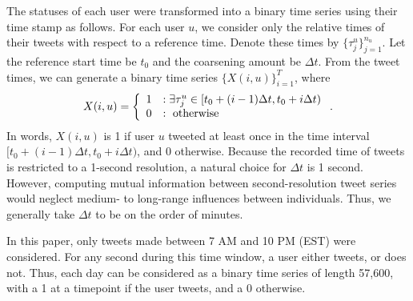 \documentclass[12pt]{article}
\begin{document}
The statuses of each user were transformed into a binary time series using their time stamp as follows. For each user $u$, we consider only the relative times of their tweets with respect to a reference time. Denote these times by $\{ \tau^{u}_{j}\}_{j = 1}^{n_{u}}$. Let the reference start time be $t_{0}$ and the coarsening amount be $\Delta t$. From the tweet times, we can generate a binary time series $\{ X(i, u)\}_{i = 1}^{T}$, where
\begin{align}
	X(i, u) = \left\{ \begin{array}{cl}
		1 &: \text{$ \exists \tau^{u}_{j} \in [t_{0} + (i - 1) \Delta t, t_{0} + i \Delta t)$} \\
		0 &: \text{ otherwise}
	\end{array}\right. .
\end{align}
In words, $X(i, u)$ is 1 if user $u$ tweeted at least once in the time interval $[t_{0} + (i - 1) \Delta t, t_{0} + i \Delta t)$, and 0 otherwise. Because the recorded time of tweets is restricted to a 1-second resolution, a natural choice for $\Delta t$ is 1 second. However, computing mutual information between second-resolution tweet series would neglect medium- to long-range influences between individuals. Thus, we generally take $\Delta t$ to be on the order of minutes.

In this paper, only tweets made between 7 AM and 10 PM (EST) were considered. For any second during this time window, a user either tweets, or does not. Thus, each day can be considered as a binary time series of length 57,600, with a 1 at a timepoint if the user tweets, and a 0 otherwise.



\end{document}
